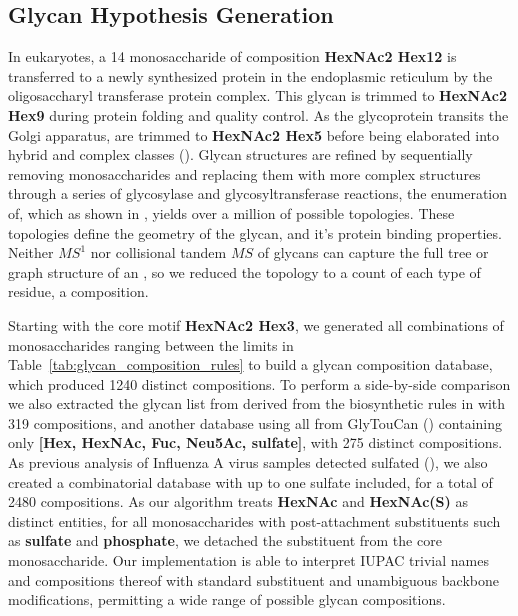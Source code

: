 \subsection{Glycan Hypothesis Generation}

    In eukaryotes, a 14 monosaccharide \nglycan of composition \textbf{HexNAc2 Hex12} is
    transferred to a newly synthesized protein in the endoplasmic reticulum by
    the oligosaccharyl transferase protein complex.  This glycan is trimmed to
    \textbf{HexNAc2 Hex9} during protein folding and quality control.  As the glycoprotein
    transits the Golgi apparatus, \nglycans are trimmed to \textbf{HexNAc2 Hex5} before
    being elaborated into hybrid and complex \nglycan classes (\cite{Stanley2009}).
    Glycan structures are refined by sequentially removing monosaccharides and replacing them
    with more complex structures through a series of glycosylase and glycosyltransferase
    reactions, the enumeration of, which as shown in \cite{Akune2016}, yields over a million
    of possible \nglycan topologies. These topologies define the geometry of the glycan,
    and it's protein binding properties. Neither $MS^1$ nor collisional tandem $MS$ of glycans
    can capture the full tree or graph structure of an \nglycan, so we reduced the topology
    to a count of each type of residue, a composition.

    Starting with the core motif \textbf{HexNAc2 Hex3}, we generated all combinations of
    monosaccharides ranging between the limits in Table~\ref{tab:glycan_composition_rules}
    to build a glycan composition database, which produced 1240 distinct compositions. To
    perform a side-by-side comparison we also extracted the glycan list from \cite{Yu2013}
    derived from the biosynthetic rules in \cite{Krambeck2005} with 319 compositions, and
    another database using all \nglycans from GlyTouCan (\cite{Tiemeyer2017}) containing only
    \textbf{[Hex, HexNAc, Fuc, Neu5Ac, sulfate]}, with 275 distinct compositions. As previous
    analysis of Influenza A virus samples detected sulfated \nglycans (\cite{Khatri2016a}),
    we also created a combinatorial database with up to one sulfate included, for a total
    of 2480 compositions. As our algorithm treats \textbf{HexNAc} and \textbf{HexNAc(S)}
    as distinct entities, for all monosaccharides with post-attachment substituents such
    as \textbf{sulfate} and \textbf{phosphate}, we detached the substituent from the core
    monosaccharide. Our implementation is able to interpret IUPAC trivial names and compositions
    thereof with standard substituent and unambiguous backbone modifications, permitting a
    wide range of possible glycan compositions.

